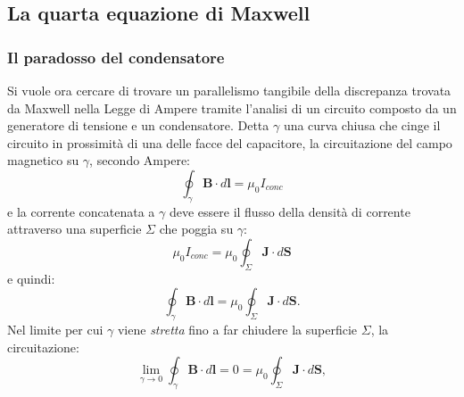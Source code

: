 \documentclass[a4paper,11pt]{report}
\begin{document}
\subsection{La quarta equazione di Maxwell}

\subsubsection{Il paradosso del condensatore}
Si vuole ora cercare di trovare un parallelismo tangibile della discrepanza trovata da Maxwell nella Legge di Ampere tramite l'analisi di un circuito composto da un generatore di tensione e un condensatore. Detta $\gamma$ una curva chiusa che cinge il circuito in prossimità di una delle facce del capacitore, la circuitazione del campo magnetico su $\gamma$, secondo Ampere:
\begin{equation}
\oint_\gamma \bm{B} \cdot d\bm{l} = \mu_0 I_{conc}
\end{equation}
e la corrente concatenata a $\gamma$ deve essere il flusso della densità di corrente attraverso una superficie $\Sigma$ che poggia su $\gamma$:
\begin{equation}
\mu_0 I_{conc} = \mu_0 \oint_\Sigma \bm{J} \cdot d\bm{S}
\end{equation}
e quindi:
\begin{equation}
\oint_\gamma \bm{B} \cdot d\bm{l} = \mu_0 \oint_\Sigma \bm{J} \cdot d\bm{S}.
\end{equation}
Nel limite per cui $\gamma$ viene \textit{stretta} fino a far chiudere la superficie $\Sigma$, la circuitazione:
\begin{equation}
\lim_{\gamma \rightarrow 0} \oint_\gamma \bm{B} \cdot d\bm{l} = 0 = \mu_0 \oint_\Sigma \bm{J} \cdot d\bm{S},
\end{equation}
\end{document}
